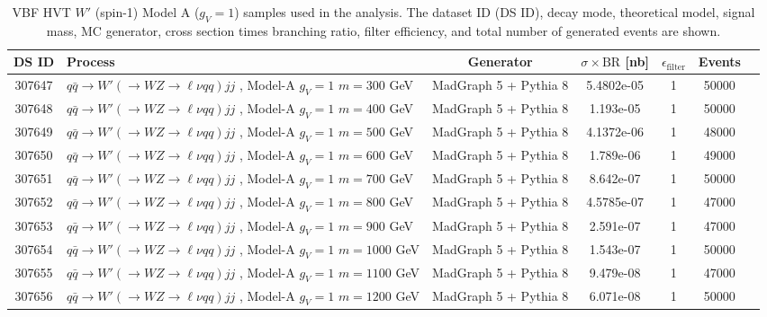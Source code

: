 \begin{landscape}
\begin{table}[!htb]
\caption[HVT $W'$ Monte Carlo samples (vector boson fusion production)]{VBF HVT $W'$ (spin-1) Model A ($g_V=1$) samples used in the analysis. The dataset ID (DS ID), decay mode, theoretical model, signal mass, MC generator, cross section times branching ratio, filter efficiency, and total number of generated events are shown.}
\label{tabular:mc_samples_WprimeVBF}
\begin{footnotesize}
\begin{center}
\begin{tabular}{c|l|c|c|c|cr}
	\hline\hline
	DS ID & Process & Generator & $\sigma\times\text{BR}$ [nb] & $\epsilon_{\text{filter}}$ & Events \\ \hline\hline
	307647 & $q\bar{q} \to W'\left(\to WZ \to \ell\nu qq\right) jj$ , Model-A $g_V=1$ $m=300$  GeV& MadGraph 5 + Pythia 8 & 5.4802e-05 & 1  & 50000 \\
	307648 & $q\bar{q} \to W'\left(\to WZ \to \ell\nu qq\right) jj$ , Model-A $g_V=1$ $m=400$  GeV& MadGraph 5 + Pythia 8 & 1.193e-05 & 1  & 50000 \\
	307649 & $q\bar{q} \to W'\left(\to WZ \to \ell\nu qq\right) jj$ , Model-A $g_V=1$ $m=500$  GeV& MadGraph 5 + Pythia 8 & 4.1372e-06 & 1  & 48000 \\
	307650 & $q\bar{q} \to W'\left(\to WZ \to \ell\nu qq\right) jj$ , Model-A $g_V=1$ $m=600$  GeV& MadGraph 5 + Pythia 8 & 1.789e-06 & 1  & 49000 \\
	307651 & $q\bar{q} \to W'\left(\to WZ \to \ell\nu qq\right) jj$ , Model-A $g_V=1$ $m=700$  GeV& MadGraph 5 + Pythia 8 & 8.642e-07 & 1  & 50000 \\
	307652 & $q\bar{q} \to W'\left(\to WZ \to \ell\nu qq\right) jj$ , Model-A $g_V=1$ $m=800$  GeV& MadGraph 5 + Pythia 8 & 4.5785e-07 & 1  & 47000 \\
	307653 & $q\bar{q} \to W'\left(\to WZ \to \ell\nu qq\right) jj$ , Model-A $g_V=1$ $m=900$  GeV& MadGraph 5 + Pythia 8 & 2.591e-07 & 1  & 47000 \\
	307654 & $q\bar{q} \to W'\left(\to WZ \to \ell\nu qq\right) jj$ , Model-A $g_V=1$ $m=1000$ GeV& MadGraph 5 + Pythia 8 & 1.543e-07 & 1  & 50000 \\
	307655 & $q\bar{q} \to W'\left(\to WZ \to \ell\nu qq\right) jj$ , Model-A $g_V=1$ $m=1100$ GeV& MadGraph 5 + Pythia 8 & 9.479e-08 & 1  & 47000 \\
	307656 & $q\bar{q} \to W'\left(\to WZ \to \ell\nu qq\right) jj$ , Model-A $g_V=1$ $m=1200$ GeV& MadGraph 5 + Pythia 8 & 6.071e-08 & 1  & 50000 \\

\end{tabular}
\end{center}
\end{footnotesize}
\end{table}
\end{landscape}
